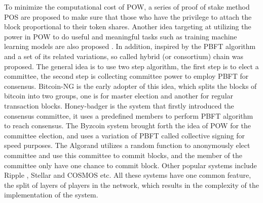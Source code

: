 To minimize the computational cost of POW, a series of proof of stake method POS \cite{duffield2018dash, tron2018, david2017ouroboros, wood2014ethereum, goodman2014tezos} 
are proposed to make sure that those who have the privilege to attach the block proportional to their token shares.
Another idea targeting at utilizing the power in POW to do useful and meaningful tasks such as training machine learning models are also proposed \cite{matthew2017aion}.
In addition, inspired by the PBFT algorithm \cite{castro1999practical} and a set of its related variations, so called hybrid (or consortium) chain was proposed. 
The general idea is to use two step algorithm, the first step is to elect a committee, the second step is collecting committee power to employ PBFT for consensus.
Bitcoin-NG \cite{eyal2016bitcoin} is the early adopter of this idea, which splits the blocks of bitcoin into two groups, one is for master election and another for regular transaction blocks. 
Honey-badger \cite{miller2016honey} is the system that firstly introduced the consensus committee, it uses a predefined members to perform PBFT algorithm to reach consensus.  
The Byzcoin system \cite{kogias2016enhancing} brought forth the idea of POW for the committee election, and uses a variation of PBFT called collective signing for speed purposes.
The Algorand \cite{gilad2017algorand} utilizes a random function to anonymously elect committee and use this committee to commit blocks, and the member of the committee only have one chance to commit block.
Other popular systems include Ripple \cite{schwartz2014ripple}, Stellar \cite{mazieres2015stellar} and COSMOS \cite{kwon2016cosmos} etc.
All these systems have one common feature, the split of layers of players in the network, which results in the complexity of the implementation of the system.

